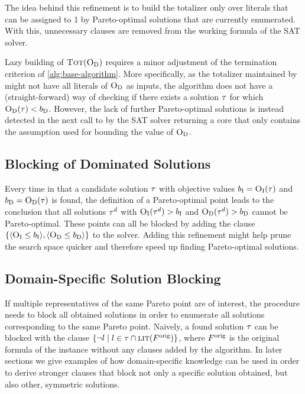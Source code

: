 The idea behind this refinement is to build the totalizer only over literals that can be assigned to 1 by Pareto-optimal solutions that are currently enumerated.
With this, unnecessary clauses are removed from the working formula of the SAT solver.

Lazy building of $\textsc{Tot}(\textsc{O}_{\text{D}})$ requires a minor adjustment of the termination criterion of \cref{alg:base-algorithm}.
More specifically, as the totalizer maintained by \Simpr{} might not have all literals of $\textsc{O}_{\text{D}}$ as inputs, the algorithm does not have a (straight-forward) way of checking if there exists a solution $\tau$ for which $\textsc{O}_{\text{D}}(\tau) < b_{\text{D}}$.
However, the lack of further Pareto-optimal solutions is instead detected in the next call to \Min{} by the SAT solver returning a core that only contains the assumption used for bounding the value of $\textsc{O}_{\text{D}}$.

\subsection{Blocking of Dominated Solutions}

Every time in \algname{} that a candidate solution $\tau$ with objective values $b_{\text{I}} = \textsc{O}_{\text{I}}(\tau)$ and $b_{\text{D}} = \textsc{O}_{\text{D}}(\tau)$ is found, the definition of a Pareto-optimal point leads to the conclusion that all solutions $\tau^d$ with $\textsc{O}_{\text{I}}(\tau^d) > b_{\text{I}}$ and $\textsc{O}_{\text{D}}(\tau^d) > b_{\text{D}}$ cannot be Pareto-optimal.
These points can all be blocked by adding the clause $\{ \langle \textsc{O}_{\text{I}} \leq b_{\text{I}} \rangle, \langle \textsc{O}_{\text{D}} \leq b_{\text{D}} \rangle \}$ to the solver.
Adding this refinement might help prune the search space quicker and therefore speed up finding Pareto-optimal solutions.

\subsection{Domain-Specific Solution Blocking}

If multiple representatives of the same Pareto point are of interest, the procedure \E{} needs to block all obtained solutions in order to enumerate all solutions corresponding to the same Pareto point. 
Naively, a found solution $\tau$ can be blocked with the clause $\{ \lnot l \mid l \in \tau \cap \textsc{lit}(F^\text{orig}) \}$, where $F^\text{orig}$ is the original formula of the instance without any clauses added by the algorithm.
In later sections we give examples of how domain-specific knowledge can be used in order to derive stronger clauses that block not only a specific solution obtained, but also other, symmetric solutions.

